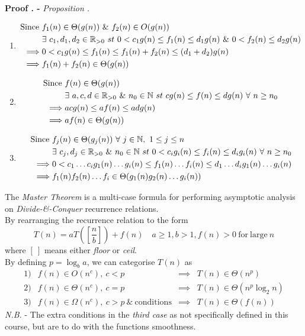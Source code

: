 \documentclass[11pt,a4paper]{article}
\begin{document}
\newpage
{}
\textbf{Proof . - }\textit{Proposition .}
\begin{enumerate}[label=\roman*)]
	\item\begin{align*}
    \mathrm{Since\ }&f_1(n)\in\Theta(g(n))\ \&\ f_2(n)\in O(g(n))\\
    &\exists\ c_1, d_1, d_2 \in\mathbb{R}_{>0}\ st\ 0<c_1g(n)\leq f_1(n) \leq d_1g(n)\ \&\ 0<f_2(n)\leq d_2g(n)\\
    \implies& 0<c_1g(n)\leq f_1(n) \leq f_1(n)+f_2(n)\leq(d_1+d_2)g(n)\\
    \implies& f_1(n)+f_2(n) \in\Theta(g(n))
  \end{align*}
  \item\begin{align*}
    \mathrm{Since\ }& f(n)\in\Theta(g(n))\\
    &\exists\ a,c,d \in\mathbb{R}_{>0}\ \&\ n_0\in\mathbb{N}\ st\ cg(n) \leq f(n) \leq dg(n)\ \forall\ n\geq n_0\\
    \implies& acg(n)\leq af(n) \leq adg(n)\\
    \implies& af(n)\in\Theta(g(n))
  \end{align*}
  \item\begin{align*}
    \mathrm{Since\ }& f_j(n)\in\Theta(g_j(n))\ \forall\ j\in\nats,\ 1\leq j\leq n\\
    &\exists\ c_j, d_j \in\real_{>0}\ \&\ n_0 \in\nats\ st\ 0<c_ig_i(n)\leq f_i(n)\leq d_ig_i(n)\ \forall\ n\geq n_0\\
    \implies& 0<c_1\dots c_ig_1(n)\dots g_i(n) \leq f_1(n)\dots f_i(n) \leq d_1\dots d_i g_1(n) \dots g_i(n)\\
    \implies& f_1(n)f_2(n)\dots f_i \in\Theta(g_1(n)g_2(n)\dots g_i(n))
  \end{align*}
\end{enumerate}

The \textit{Master Theorem} is a multi-case formula for performing asymptotic analysis on \textit{Divide-\&-Conquer} recurrence relations.\\
By rearranging the recurrence relation to the form
$$T(n)=aT\left(\left[\frac{n}{b}\right]\right) + f(n)\quad a\geq1, b>1, f(n)>0 \mathrm{\ for\ large\ }n$$
where $[\ ]$ means either \textit{floor} or \textit{ceil}.\\
By defining $p=\log_ba$, we can categorise $T(n)$ as
\[\begin{array}{rrcl}
1)&f(n)\in O(n^c),\ c<p &\implies& T(n)\in\Theta(n^p)\\
2)&f(n)\in \Theta(n^c),\ c=p &\implies& T(n)\in\Theta(n^p\log_2n)\\
3)&f(n)\in \Omega(n^c),\ c>p\ \&\ \mathrm{conditions} &\implies& T(n)\in\Theta(f(n))
\end{array}\]
\textit{N.B.} - The extra conditions in the \textit{third case} as not specifically defined in this course, but are to do with the functions smoothness.\\
\end{document}
